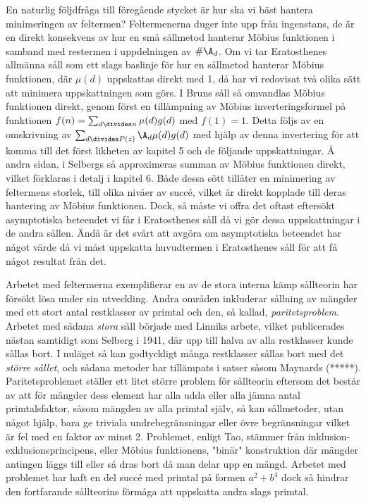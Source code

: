 En naturlig följdfråga till föregående stycket är hur ska vi bäst hantera minimeringen av feltermen?
Feltermenerna duger inte upp från ingenstans, de är en direkt konsekvens av hur en små sållmetod hanterar Möbius funktionen i samband med restermen i uppdelningen av \(\#\A_d\).
Om vi tar Eratosthenes allmänna såll som ett slags baslinje för hur en sållmetod hanterar Möbius funktionen, där \(\mu(d)\) uppskattas direkt med 1, då har vi redovisat två olika sätt att minimera uppskattningen som görs. 
I Bruns såll så omvandlas Möbius funktionen direkt, genom först en tillämpning av Möbius inverteringsformel på funktionen \(f(n) = \sum_{d\divides n}\mu(d)g(d)\) med \(f(1) = 1\). 
Detta följs av en omskrivning av \(\sum_{d\divides P(z)}\A_d \mu(d) g(d)\) med hjälp av denna invertering för att komma till det först likheten av kapitel 5 och de följande uppskattningar. 
Å andra sidan, i Selbergs så approximeras summan av Möbius funktionen direkt, vilket förklaras i detalj i kapitel 6.
Både dessa sött tillåter en minimering av feltermens storlek, till olika nivåer av succé, vilket är direkt kopplade till deras hantering av Möbius funktionen.
Dock, så måste vi offra det oftast eftersökt asymptotiska beteendet vi får i Eratosthenes såll då vi gör dessa uppskattningar i de andra sållen.
Ändå är det svårt att avgöra om asymptotiska beteendet har något värde då vi måst uppskatta huvudtermen i Eratosthenes såll för att få något resultat från det.



Arbetet med feltermerna exemplifierar en av de stora interna kämp sållteorin har försökt lösa under sin utveckling.
Andra områden inkluderar sållning av mängder med ett stort antal restklasser av primtal och den, så kallad, \textit{paritetsproblem}. Arbetet med sådana \textit{stora} såll började med Linniks arbete, vilket publicerades nästan samtidigt som Selberg i 1941, där upp till halva av alla restklasser kunde sållas bort. 
I nuläget så kan godtyckligt många restklasser sållas bort med det \textit{större sållet}, och sådana metoder har tillämpats i satser såsom Maynards \cite{mayBound}(*****).
Paritetsproblemet ställer ett litet större problem för sållteorin eftersom det består av att för mängder dess element har alla udda eller alla jämna antal primtalsfaktor, såsom mängden av alla primtal själv, så kan sållmetoder, utan något hjälp, bara ge triviala undrebegränsningar eller övre begränsningar vilket är fel med en faktor av minst 2.
Problemet, enligt Tao, stämmer från inklusion-exklusionsprincipens, eller Möbius funktionens, "binär" konstruktion där mängder antingen läggs till eller så dras bort då man delar upp en mängd.
Arbetet med problemet har haft en del succé med primtal på formen \(a^2 + b^4\) dock så hindrar den fortfarande sållteorins förmåga att uppskatta andra slags primtal.